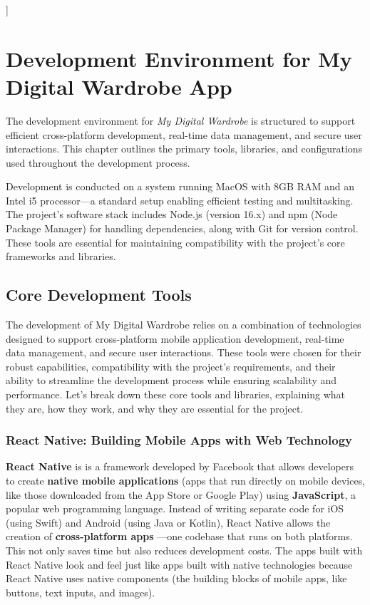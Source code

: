 ]
\chapter{Development Environment for My Digital Wardrobe App}
\label{chap:Chaptert3}
The development environment for \textit{My Digital Wardrobe} is structured to support efficient cross-platform development, real-time data management, and secure user interactions. This chapter outlines the primary tools, libraries, and configurations used throughout the development process.

Development is conducted on a system running MacOS with 8GB RAM and an Intel i5 processor—a standard setup enabling efficient testing and multitasking. The project’s software stack includes Node.js (version 16.x) and npm (Node Package Manager) for handling dependencies, along with Git for version control. These tools are essential for maintaining compatibility with the project’s core frameworks and libraries.

\section{Core Development Tools}
\label{sec:coredev}
The development of My Digital Wardrobe relies on a combination of  technologies designed to support cross-platform mobile application development, real-time data management, and secure user interactions. These tools were chosen for their robust capabilities, compatibility with the project’s requirements, and their ability to streamline the development process while ensuring scalability and performance. Let’s break down these core tools and libraries, explaining what they are, how they work, and why they are essential for the project.

\subsection{React Native: Building Mobile Apps with Web Technology}
   \textbf{React Native} is is a framework developed by Facebook that allows developers to create \textbf{native mobile applications} (apps that run directly on mobile devices, like those downloaded from the App Store or Google Play) using \textbf{JavaScript}, a popular web programming language.\cite{reactnative} Instead of writing separate code for iOS (using Swift) and Android (using Java or Kotlin), React Native allows the creation of \textbf{cross-platform apps} —one codebase that runs on both platforms. This not only saves time but also reduces development costs. The apps built with React Native look and feel just like apps built with native technologies because React Native uses native components (the building blocks of mobile apps, like buttons, text inputs, and images).
   

